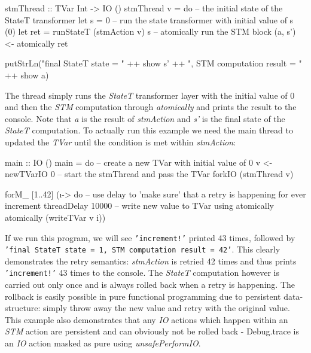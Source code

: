 \begin{HaskellCode}
stmThread :: TVar Int -> IO ()
stmThread v = do
  -- the initial state of the StateT transformer
  let s = 0
  -- run the state transformer with initial value of s (0)
  let ret = runStateT (stmAction v) s
  -- atomically run the STM block
  (a, s') <- atomically ret
  
  putStrLn("final StateT state     = " ++ show s' ++
           ", STM computation result = " ++ show a)
\end{HaskellCode}

The thread simply runs the \textit{StateT} transformer layer with the initial value of 0 and then the \textit{STM} computation through \textit{atomically} and prints the result to the console. Note that \textit{a} is the result of \textit{stmAction} and \textit{s'} is the final state of the \textit{StateT} computation. To actually run this example we need the main thread to updated the \textit{TVar} until the condition is met within \textit{stmAction}:

\begin{HaskellCode}
main :: IO ()
main = do
  -- create a new TVar with initial value of 0
  v <- newTVarIO 0 
  -- start the stmThread and pass the TVar
  forkIO (stmThread v)

  forM_ [1..42] (\i -> do
    -- use delay to 'make sure' that a retry is happening for ever increment
    threadDelay 10000
    -- write new value to TVar using atomically
    atomically (writeTVar v i))
\end{HaskellCode}

If we run this program, we will see \texttt{'increment!'} printed 43 times, followed by \texttt{'final StateT state = 1, STM computation result = 42'}. This clearly demonstrates the retry semantics: \textit{stmAction} is retried 42 times and thus prints \texttt{'increment!'} 43 times to the console. The \textit{StateT} computation however is carried out only once and is always rolled back when a retry is happening. The rollback is easily possible in pure functional programming due to persistent data-structure: simply throw away the new value and retry with the original value. This example also demonstrates that any \textit{IO} actions which happen within an \textit{STM} action are persistent and can obviously not be rolled back - Debug.trace is an \textit{IO} action masked as pure using \textit{unsafePerformIO}.